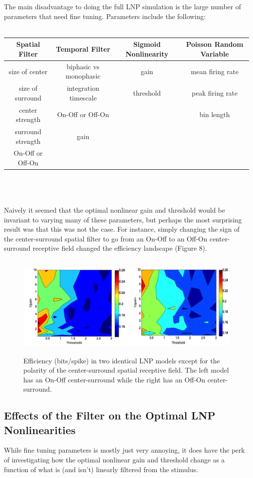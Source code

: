 \documentclass[12pt]{article}
\begin{document}
The main disadvantage to doing the full LNP simulation is the large number of parameters that need fine tuning.  Parameters include the following: \\
\\
\begin{tabular}{|c|c|c|c|} \hline
\bf{Spatial Filter} & \bf{Temporal Filter} & \bf{Sigmoid Nonlinearity} & \bf{Poisson Random Variable}  \\ \hline
size of center & biphasic vs monophasic & gain & mean firing rate \\ \hline
size of surround & integration timescale & threshold & peak firing rate \\ \hline
center strength & On-Off or Off-On &  & bin length \\ \hline
surround strength & gain &  &  \\ \hline
On-Off or Off-On &  &  &  \\ \hline
\end{tabular}
\\
\\
\\
Naively it seemed that the optimal nonlinear gain and threshold would be invariant to varying many of these parameters, but perhaps the most surprising result was that this was not the case.  For instance, simply changing the sign of the center-surround spatial filter to go from an On-Off to an Off-On center-surround receptive field changed the efficiency landscape (Figure 8).



\begin{figure}[h!!]
\centerline{\includegraphics*[height = 2.0in,width=6.0in,angle=0]{On_vs_Off.png}}
\label{Figure 8}
\caption{Efficiency (bits/spike) in two identical LNP models except for the polarity of the center-surround spatial receptive field.  The left model has an On-Off center-surround while the right has an Off-On center-surround.}
\end{figure}

\subsection{Effects of the Filter on the Optimal LNP Nonlinearities}
While fine tuning parameters is mostly just very annoying, it does have the perk of investigating how the optimal nonlinear gain and threshold change as a function of what is (and isn't) linearly filtered from the stimulus. 
\end{document}
